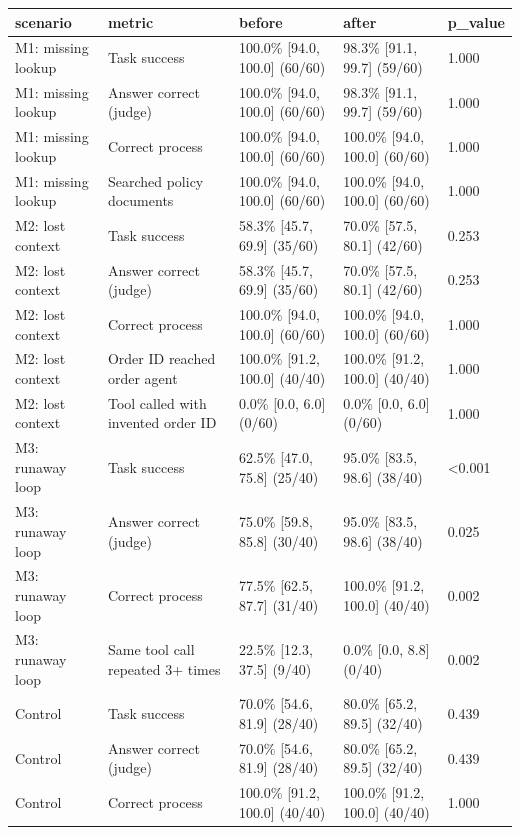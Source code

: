 \begin{tabular}{lllll}
\toprule
scenario & metric & before & after & p\_value \\
\midrule
M1: missing lookup & Task success & 100.0\% [94.0, 100.0] (60/60) & 98.3\% [91.1, 99.7] (59/60) & 1.000 \\
M1: missing lookup & Answer correct (judge) & 100.0\% [94.0, 100.0] (60/60) & 98.3\% [91.1, 99.7] (59/60) & 1.000 \\
M1: missing lookup & Correct process & 100.0\% [94.0, 100.0] (60/60) & 100.0\% [94.0, 100.0] (60/60) & 1.000 \\
M1: missing lookup & Searched policy documents & 100.0\% [94.0, 100.0] (60/60) & 100.0\% [94.0, 100.0] (60/60) & 1.000 \\
M2: lost context & Task success & 58.3\% [45.7, 69.9] (35/60) & 70.0\% [57.5, 80.1] (42/60) & 0.253 \\
M2: lost context & Answer correct (judge) & 58.3\% [45.7, 69.9] (35/60) & 70.0\% [57.5, 80.1] (42/60) & 0.253 \\
M2: lost context & Correct process & 100.0\% [94.0, 100.0] (60/60) & 100.0\% [94.0, 100.0] (60/60) & 1.000 \\
M2: lost context & Order ID reached order agent & 100.0\% [91.2, 100.0] (40/40) & 100.0\% [91.2, 100.0] (40/40) & 1.000 \\
M2: lost context & Tool called with invented order ID & 0.0\% [0.0, 6.0] (0/60) & 0.0\% [0.0, 6.0] (0/60) & 1.000 \\
M3: runaway loop & Task success & 62.5\% [47.0, 75.8] (25/40) & 95.0\% [83.5, 98.6] (38/40) & <0.001 \\
M3: runaway loop & Answer correct (judge) & 75.0\% [59.8, 85.8] (30/40) & 95.0\% [83.5, 98.6] (38/40) & 0.025 \\
M3: runaway loop & Correct process & 77.5\% [62.5, 87.7] (31/40) & 100.0\% [91.2, 100.0] (40/40) & 0.002 \\
M3: runaway loop & Same tool call repeated 3+ times & 22.5\% [12.3, 37.5] (9/40) & 0.0\% [0.0, 8.8] (0/40) & 0.002 \\
Control & Task success & 70.0\% [54.6, 81.9] (28/40) & 80.0\% [65.2, 89.5] (32/40) & 0.439 \\
Control & Answer correct (judge) & 70.0\% [54.6, 81.9] (28/40) & 80.0\% [65.2, 89.5] (32/40) & 0.439 \\
Control & Correct process & 100.0\% [91.2, 100.0] (40/40) & 100.0\% [91.2, 100.0] (40/40) & 1.000 \\
\bottomrule
\end{tabular}
